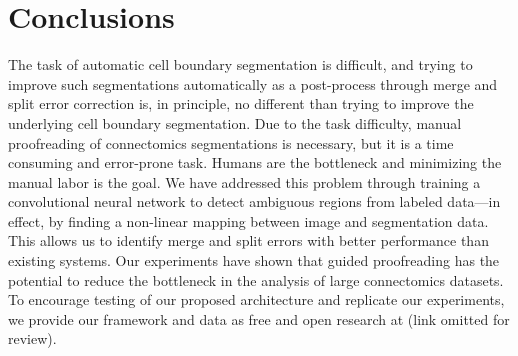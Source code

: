 \section{Conclusions}

The task of automatic cell boundary segmentation is difficult, and trying to improve such segmentations automatically as a post-process through merge and split error correction is, in principle, no different than trying to improve the underlying cell boundary segmentation. Due to the task difficulty, manual proofreading of connectomics segmentations is necessary, but it is a time consuming and error-prone task. Humans are the bottleneck and minimizing the manual labor is the goal.
We have addressed this problem through training a convolutional neural network to detect ambiguous regions from labeled data---in effect, by finding a non-linear mapping between image and segmentation data. This allows us to identify merge and split errors with better performance than existing systems. Our experiments have shown that guided proofreading has the potential to reduce the bottleneck in the analysis of large connectomics datasets. To encourage testing of our proposed architecture and replicate our experiments, we provide our framework and data as free and open research at (link omitted for review).